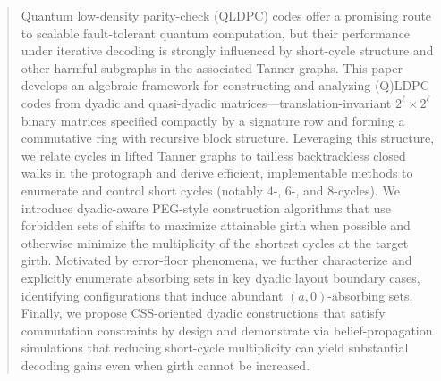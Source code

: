 \documentclass[11pt]{article}
\theoremstyle{plain}
\theoremstyle{plain}
\theoremstyle{definition}
\numberwithin{theo}{section}
\newcounter{ara}
\newcounter{rom}
\begin{document}
\begin{abstract}
Quantum low-density parity-check (QLDPC) codes offer a promising route to scalable fault-tolerant quantum computation, but their performance under iterative decoding is strongly influenced by short-cycle structure and other harmful subgraphs in the associated Tanner graphs. This paper develops an algebraic framework for constructing and analyzing (Q)LDPC codes from dyadic and quasi-dyadic matrices—translation-invariant $2^\ell \times 2^\ell$ binary matrices specified compactly by a signature row and forming a commutative ring with recursive block structure. Leveraging this structure, we relate cycles in lifted Tanner graphs to tailless backtrackless closed walks in the protograph and derive efficient, implementable methods to enumerate and control short cycles (notably $4$-, $6$-, and $8$-cycles). We introduce dyadic-aware PEG-style construction algorithms that use forbidden sets of shifts to maximize attainable girth when possible and otherwise minimize the multiplicity of the shortest cycles at the target girth. Motivated by error-floor phenomena, we further characterize and explicitly enumerate absorbing sets in key dyadic layout boundary cases, identifying configurations that induce abundant $(a,0)$-absorbing sets. Finally, we propose CSS-oriented dyadic constructions that satisfy commutation constraints by design and demonstrate via belief-propagation simulations that reducing short-cycle multiplicity can yield substantial decoding gains even when girth cannot be increased.
\end{abstract}


%
\end{document}
